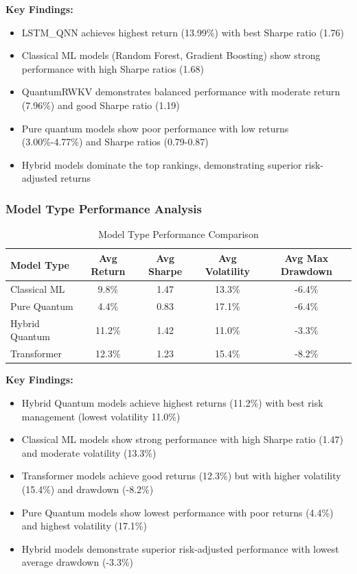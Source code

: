 \documentclass[12pt,a4paper]{article}
\begin{document}
\textbf{Key Findings:}
\begin{itemize}
    \item LSTM\_QNN achieves highest return (13.99\%) with best Sharpe ratio (1.76)
    \item Classical ML models (Random Forest, Gradient Boosting) show strong performance with high Sharpe ratios (1.68)
    \item QuantumRWKV demonstrates balanced performance with moderate return (7.96\%) and good Sharpe ratio (1.19)
    \item Pure quantum models show poor performance with low returns (3.00\%-4.77\%) and Sharpe ratios (0.79-0.87)
    \item Hybrid models dominate the top rankings, demonstrating superior risk-adjusted returns
\end{itemize}

\subsubsection{Model Type Performance Analysis}

\begin{table}[H]
\centering
\begin{tabular}{@{}lcccc@{}}
\toprule
\textbf{Model Type} & \textbf{Avg Return} & \textbf{Avg Sharpe} & \textbf{Avg Volatility} & \textbf{Avg Max Drawdown} \\
\midrule
Classical ML & 9.8\% & 1.47 & 13.3\% & -6.4\% \\
Pure Quantum & 4.4\% & 0.83 & 17.1\% & -6.4\% \\
Hybrid Quantum & 11.2\% & 1.42 & 11.0\% & -3.3\% \\
Transformer & 12.3\% & 1.23 & 15.4\% & -8.2\% \\
\bottomrule
\end{tabular}
\caption{Model Type Performance Comparison}
\end{table}

\textbf{Key Findings:}
\begin{itemize}
    \item Hybrid Quantum models achieve highest returns (11.2\%) with best risk management (lowest volatility 11.0\%)
    \item Classical ML models show strong performance with high Sharpe ratio (1.47) and moderate volatility (13.3\%)
    \item Transformer models achieve good returns (12.3\%) but with higher volatility (15.4\%) and drawdown (-8.2\%)
    \item Pure Quantum models show lowest performance with poor returns (4.4\%) and highest volatility (17.1\%)
    \item Hybrid models demonstrate superior risk-adjusted performance with lowest average drawdown (-3.3\%)
\end{itemize}
\end{document}
